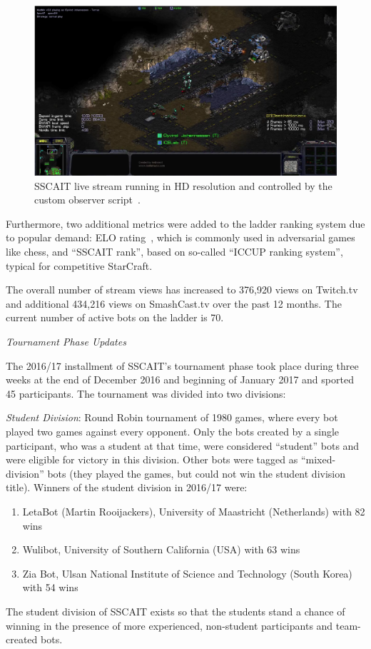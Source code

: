 \begin{figure}[t]
  \centering
  \includegraphics[width=1\columnwidth]{fig/sscait-stream.png}
  \caption{SSCAIT live stream running in HD resolution and controlled by the custom observer script~\cite{mattsson2015automatic}.}
  \label{figSSCAITstream}
\end{figure}

Furthermore, two additional metrics were added to the ladder ranking system due to popular demand: ELO rating~\cite{elo1978rating}, which is commonly used in adversarial games like chess, and ``SSCAIT rank'', based on so-called ``ICCUP ranking system'', typical for competitive StarCraft.

The overall number of stream views has increased to 376,920 views on Twitch.tv and additional 434,216 views on SmashCast.tv over the past 12 months. The current number of active bots on the ladder is 70.

\begin{center}
\emph{Tournament Phase Updates} 
\end{center}

\noindent The 2016/17 installment of SSCAIT's tournament phase took place during three weeks at the end of December 2016 and beginning of January 2017 and sported 45 participants. The tournament was divided into two divisions:

\emph{Student Division}: Round Robin tournament of 1980 games, where every bot played two games against every opponent. Only the bots created by a single participant, who was a student at that time, were considered ``student'' bots and were eligible for victory in this division. Other bots were tagged as ``mixed-division'' bots (they played the games, but could not win the student division title). Winners of the student division in 2016/17 were:
  \begin{enumerate}
	\item LetaBot (Martin Rooijackers), University of Maastricht (Netherlands) with 82 wins
	\item Wulibot, University of Southern California (USA) with 63 wins
	\item Zia Bot, Ulsan National Institute of Science and Technology (South Korea) with 54 wins
  \end{enumerate}
The student division of SSCAIT exists so that the students stand a chance of winning in the presence of more experienced, non-student participants and team-created bots.

